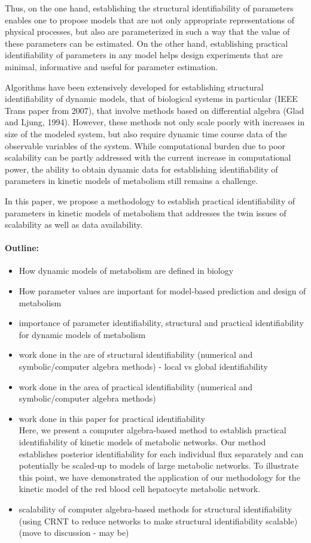 \documentclass[10pt]{article}
\begin{document}
	Thus, on the one hand, establishing the structural identifiability of parameters enables one to propose models that are not only appropriate representations of physical processes, but also are parameterized in such a way that the value of these parameters can be estimated. On the other hand, establishing practical identifiability of parameters in any model helps design experiments that are minimal, informative and useful for parameter estimation.
	
	Algorithms have been extensively developed for establishing structural identifiability of dynamic models, that of biological systems in particular (IEEE Trans paper from 2007), that involve methods based on differential algebra (Glad and Ljung, 1994). However, these methods not only scale poorly with increases in size of the modeled system, but also require dynamic time course data of the observable variables of the system. While computational burden due to poor scalability can be partly addressed with the current increase in computational power, the ability to obtain dynamic data for establishing identifiability of parameters in kinetic models of metabolism still remains a challenge. 
	
	In this paper, we propose a methodology to establish practical identifiability of parameters in kinetic models of metabolism that addresses the twin issues of scalability as well as data availability. 
	
	\paragraph{Outline:}
	\begin{itemize}
		\item How dynamic models of metabolism are defined in biology
		\item How parameter values are important for model-based prediction and design of metabolism
		\item importance of parameter identifiability, structural and practical identifiability for dynamic models of metabolism
		\item work done in the are of structural identifiability (numerical and symbolic/computer algebra methods) - local vs global identifiability
		\item work done in the area of practical identifiability (numerical and symbolic/computer algebra methods)
		\item work done in this paper for practical identifiability\\
		Here, we present a computer algebra-based method to establish practical identifiability of kinetic models of metabolic networks. Our method establishes posterior identifiability for each individual flux separately and can potentially be scaled-up to models of large metabolic networks. To illustrate this point, we have demonstrated the application of our methodology for the kinetic model of the red blood cell hepatocyte metabolic network.
		\item scalability of computer algebra-based methods for structural identifiability (using CRNT to reduce networks to make structural identifiability scalable) (move to discussion - may be)
	\end{itemize}
	
\end{document}
